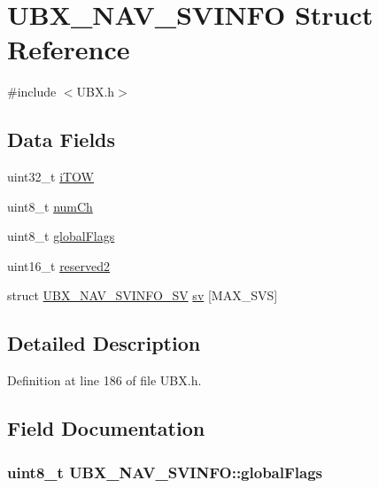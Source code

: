 \hypertarget{struct_u_b_x___n_a_v___s_v_i_n_f_o}{\section{\-U\-B\-X\-\_\-\-N\-A\-V\-\_\-\-S\-V\-I\-N\-F\-O \-Struct \-Reference}
\label{struct_u_b_x___n_a_v___s_v_i_n_f_o}
}


{\ttfamily \#include $<$\-U\-B\-X.\-h$>$}

\subsection*{\-Data \-Fields}
\begin{DoxyCompactItemize}
\item 
uint32\-\_\-t \hyperlink{struct_u_b_x___n_a_v___s_v_i_n_f_o_af3c4fbdc3e4b6fe40fae556f1de555bb}{i\-T\-O\-W}
\item 
uint8\-\_\-t \hyperlink{struct_u_b_x___n_a_v___s_v_i_n_f_o_a0c11d355a8dcd6cf6687ce19ae052a52}{num\-Ch}
\item 
uint8\-\_\-t \hyperlink{struct_u_b_x___n_a_v___s_v_i_n_f_o_a9ea30e93a506e7749f8121ff4e811aae}{global\-Flags}
\item 
uint16\-\_\-t \hyperlink{struct_u_b_x___n_a_v___s_v_i_n_f_o_a2c5c4d3b1882220da507ddacbe43159b}{reserved2}
\item 
struct \hyperlink{struct_u_b_x___n_a_v___s_v_i_n_f_o___s_v}{\-U\-B\-X\-\_\-\-N\-A\-V\-\_\-\-S\-V\-I\-N\-F\-O\-\_\-\-S\-V} \hyperlink{struct_u_b_x___n_a_v___s_v_i_n_f_o_ae22f11e4be4f99b2627ff494e335a313}{sv} \mbox{[}\-M\-A\-X\-\_\-\-S\-V\-S\mbox{]}
\end{DoxyCompactItemize}


\subsection{\-Detailed \-Description}


\-Definition at line 186 of file \-U\-B\-X.\-h.



\subsection{\-Field \-Documentation}
\hypertarget{struct_u_b_x___n_a_v___s_v_i_n_f_o_a9ea30e93a506e7749f8121ff4e811aae}{
\subsubsection[{global\-Flags}]{\setlength{\rightskip}{0pt plus 5cm}uint8\-\_\-t {\bf \-U\-B\-X\-\_\-\-N\-A\-V\-\_\-\-S\-V\-I\-N\-F\-O\-::global\-Flags}}}\label{struct_u_b_x___n_a_v___s_v_i_n_f_o_a9ea30e93a506e7749f8121ff4e811aae}


